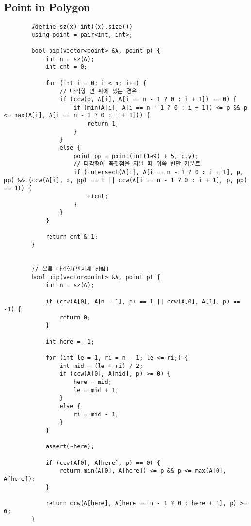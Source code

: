 \documentclass[landscape, 8pt, a4paper, oneside, twocolumn]{extarticle}
\begin{document}
	\subsection{Point in Polygon}
	\begin{verbatim}
		#define sz(x) int((x).size())
		using point = pair<int, int>;
		
		bool pip(vector<point> &A, point p) {
			int n = sz(A);
			int cnt = 0;
			
			for (int i = 0; i < n; i++) {
				// 다각형 변 위에 있는 경우
				if (ccw(p, A[i], A[i == n - 1 ? 0 : i + 1]) == 0) {
					if (min(A[i], A[i == n - 1 ? 0 : i + 1]) <= p && p <= max(A[i], A[i == n - 1 ? 0 : i + 1])) {
						return 1;
					}
				}
				else {
					point pp = point(int(1e9) + 5, p.y);
					// 다각형이 꼭짓점을 지날 때 위쪽 변만 카운트
					if (intersect(A[i], A[i == n - 1 ? 0 : i + 1], p, pp) && (ccw(A[i], p, pp) == 1 || ccw(A[i == n - 1 ? 0 : i + 1], p, pp) == 1)) {
						++cnt;
					}
				}
			}
			
			return cnt & 1;
		}
		
		
		// 볼록 다각형(반시계 정렬)
		bool pip(vector<point> &A, point p) {
			int n = sz(A);
			
			if (ccw(A[0], A[n - 1], p) == 1 || ccw(A[0], A[1], p) == -1) {
				return 0;
			}
			
			int here = -1;
			
			for (int le = 1, ri = n - 1; le <= ri;) {
				int mid = (le + ri) / 2;
				if (ccw(A[0], A[mid], p) >= 0) {
					here = mid;
					le = mid + 1;
				}
				else {
					ri = mid - 1;
				}
			}
			
			assert(~here);
			
			if (ccw(A[0], A[here], p) == 0) {
				return min(A[0], A[here]) <= p && p <= max(A[0], A[here]);
			}
			
			return ccw(A[here], A[here == n - 1 ? 0 : here + 1], p) >= 0;
		}
	\end{verbatim}
\end{document}

